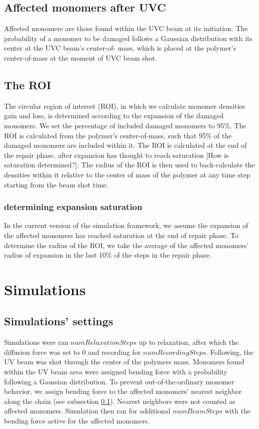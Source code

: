 \documentclass[12pt]{report}
\begin{document}
     \subsection{Affected monomers after UVC}\label{subsection_affectedMonomersAfterUVC}
     Affected monomers are those found within the UVC beam at its initiation. The probability of a monomer to be damaged follows a Gaussian distribution with its center at the UVC beam's center-of- mass, which is placed at the polymer's center-of-mass at the moment of UVC beam shot.       
      
    \subsection{The ROI}
    The circular region of interest (ROI), in which we calculate monomer densities gain and loss, is determined according to the expansion of the damaged monomers.
    We set the percentage of included damaged monomers to 95\%. The ROI is calculated from the polymer's center-of-mass, such that 95\% of the damaged monomers are included within it. 
    The ROI is calculated at the end of the repair phase, after expansion has thought to reach saturation [How is saturation determined?]. The radius of the ROI is then used to back-calculate the densities within it relative to the center of mass of the polymer at any time step starting from the beam shot time. 
    \subsubsection{determining expansion saturation}
     In the current version of the simulation framework, we assume the expansion of the affected monomers has reached saturation at the end of repair phase. To determine the radius of the ROI, we take the average of the affected monomers' radius of expansion in the last 10\% of the steps in the repair phase. 

    		             		
	\section{Simulations}	
	
	\subsection{Simulations' settings}
	Simulations were ran $numRelaxationSteps$ up to relaxation, after which the diffusion force was set to $0$ and recording for $numRecordingSteps$. Following, the UV beam was shot through the center of the polymers mass. Monomers found within the UV beam area were assigned bending force with a probability following a Gaussian distribution. To prevent out-of-the-ordinary monomer behavior, we assign bending force to the affected monomers' nearest neighbor along the chain (see subsection \ref{subsection_affectedMonomersAfterUVC}). Nearest neighbors were not counted as affected monomers. Simulation then ran for additional $numBeamSteps$ with the bending force active for the affected monomers.
	
\end{document}
